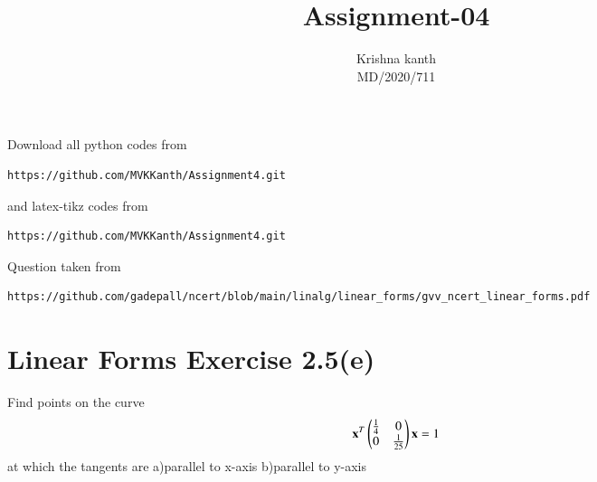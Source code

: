 \documentclass[journal,12pt,twocolumn]{IEEEtran}
\begin{document}
\def\rightbox#1{\makebox[0in][r]{#1}}
\def\centbox#1{\makebox[0in]{#1}}
\def\topbox#1{\raisebox{-\baselineskip}[0in][0in]{#1}}
\def\midbox#1{\raisebox{-0.5\baselineskip}[0in][0in]{#1}}
\vspace{3cm}
\title{Assignment-04}
\author{Krishna kanth\\MD/2020/711}
\maketitle
\newpage
\bigskip
\renewcommand{\thefigure}{\theenumi}
\renewcommand{\thetable}{\theenumi}
Download all python codes from
\begin{lstlisting}
https://github.com/MVKKanth/Assignment4.git
\end{lstlisting}
%
and latex-tikz codes from
%
\begin{lstlisting}
https://github.com/MVKKanth/Assignment4.git
\end{lstlisting}
%
Question taken from
\begin{lstlisting}
https://github.com/gadepall/ncert/blob/main/linalg/linear_forms/gvv_ncert_linear_forms.pdf
\end{lstlisting}
\section{Linear Forms Exercise 2.5(e)}
Find points on the curve 
\begin{align}
\mathbf{x}^T\begin{pmatrix}\frac{1}{4} & 0 \\ 0 & \frac{1}{25}\end{pmatrix}\mathbf{x} = 1 \label{quad/79/2.0.1}
\end{align}
at which the tangents are 
a)parallel to x-axis
b)parallel to y-axis
\end{document}
